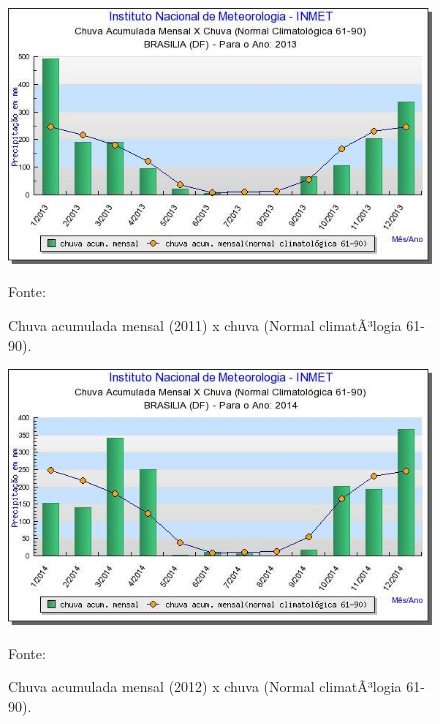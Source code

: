 \begin{figure}[H]
	 \centering
	\label{Chuva acumulada mensal (2013) x chuva (Normal climatÃ³logia 61-90)}
	 \includegraphics[scale=0.6]{captacao/3.jpg}
	 \caption{Chuva acumulada mensal (2011) x chuva (Normal climatÃ³logia 61-90).}
	\small{Fonte: \cite{INMET}}
\end{figure}
 
 
\begin{figure}[H]
	 \centering
	\label{Chuva acumulada mensal (2014) x chuva (Normal climatÃ³logia 61-90)}
	 \includegraphics[scale=0.6]{captacao/4.jpg}
	 \caption{Chuva acumulada mensal (2012) x chuva (Normal climatÃ³logia 61-90).}
	\small{Fonte: \cite{INMET}}
\end{figure}

